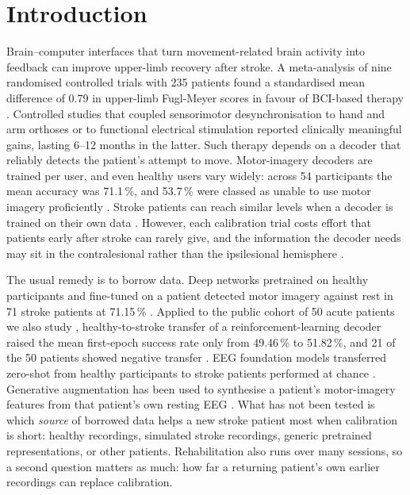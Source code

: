 \documentclass[11pt]{article}
\newcommand{\pct}{\,\%}
\begin{document}
\begin{abstract}
\textbf{Significance.} Few-trial stroke BCIs should borrow from real patients and from the patient's own history, not from simulated or healthy brains, and combining these sources with adaptation during the session brings few-trial decoding close to 90\pct{}. Code, a real-time implementation and the pre-registration trail are released.
\end{abstract}

\section{Introduction}

Brain--computer interfaces that turn movement-related brain activity into feedback can improve upper-limb recovery after stroke. A meta-analysis of nine randomised controlled trials with 235 patients found a standardised mean difference of 0.79 in upper-limb Fugl-Meyer scores in favour of BCI-based therapy \citep{cervera2018}. Controlled studies that coupled sensorimotor desynchronisation to hand and arm orthoses \citep{ramosmurguialday2013} or to functional electrical stimulation \citep{biasiucci2018} reported clinically meaningful gains, lasting 6--12 months in the latter. Such therapy depends on a decoder that reliably detects the patient's attempt to move. Motor-imagery decoders are trained per user, and even healthy users vary widely: across 54 participants the mean accuracy was 71.1\pct{}, and 53.7\pct{} were classed as unable to use motor imagery proficiently \citep{lee2019}. Stroke patients can reach similar levels when a decoder is trained on their own data \citep{ang2011}. However, each calibration trial costs effort that patients early after stroke can rarely give, and the information the decoder needs may sit in the contralesional rather than the ipsilesional hemisphere \citep{mansour2022}.

The usual remedy is to borrow data. Deep networks pretrained on healthy participants and fine-tuned on a patient detected motor imagery against rest in 71 stroke patients at 71.15\pct{} \citep{nagarajan2024}. Applied to the public cohort of 50 acute patients we also study \citep{liu2024}, healthy-to-stroke transfer of a reinforcement-learning decoder raised the mean first-epoch success rate only from 49.46\pct{} to 51.82\pct{}, and 21 of the 50 patients showed negative transfer \citep{via2026}. EEG foundation models transferred zero-shot from healthy participants to stroke patients performed at chance \citep{nguyen2026}. Generative augmentation has been used to synthesise a patient's motor-imagery features from that patient's own resting EEG \citep{xu2026}. What has not been tested is which \emph{source} of borrowed data helps a new stroke patient most when calibration is short: healthy recordings, simulated stroke recordings, generic pretrained representations, or other patients. Rehabilitation also runs over many sessions, so a second question matters as much: how far a returning patient's own earlier recordings can replace calibration.
\end{document}

